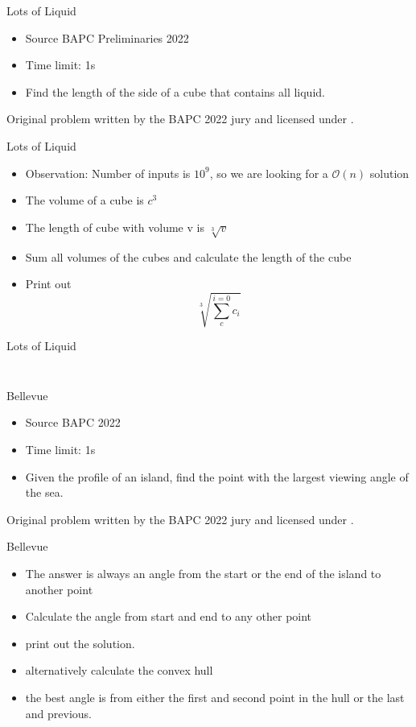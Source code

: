 \documentclass[11pt,pdf, aspectratio=169]{beamer}
\begin{document}
  \begin{frame}{Lots of Liquid}
    \begin{itemize}
      \item Source BAPC Preliminaries 2022
      \item Time limit: 1s
      \item Find the length of the side of a cube that contains all liquid.
    \end{itemize}
      Original problem written by the BAPC 2022 jury and licensed under \doclicenseLongNameRef.
      \doclicenseImage
  \end{frame}
  \begin{frame}{Lots of Liquid}
    \begin{itemize}
      \item Observation: Number of inputs is $10^9$, so we are looking for a $\mathcal{O}(n)$ solution
      \item The volume of a cube is $c^3$
      \item The length of cube with volume v  is $\sqrt[3]{v}$
      \item Sum all volumes of the cubes and calculate the length of the cube
      \item Print out \[\sqrt[3]{\sum_c^{i=0}c_i}\]
    \end{itemize}
  \end{frame}
  \begin{frame}[containsverbatim]{Lots of Liquid}
    \inputminted{python}{code/session-1/python/dapc-l.py}
    \inputminted{kotlin}{code/session-1/kotlin/dapc-l.kt}
  \end{frame}
  \begin{frame}{Bellevue}
    \begin{itemize}
      \item Source BAPC 2022
      \item Time limit: 1s
      \item  Given the profile of an island, find the point with the largest viewing angle of the sea.
    \end{itemize}
    Original problem written by the BAPC 2022 jury and licensed under \doclicenseLongNameRef.
    \doclicenseImage
  \end{frame}
  \begin{frame}{Bellevue}
    \begin{itemize}
      \item The answer is always an angle from the start or the end of the island to another point
      \item Calculate the angle from start and end to any other point
      \item print out the solution.\\
      \item alternatively calculate the convex hull
      \item the best angle is from either the first and second point in the hull or the last and previous.
    \end{itemize}
  \end{frame}
\end{document}
